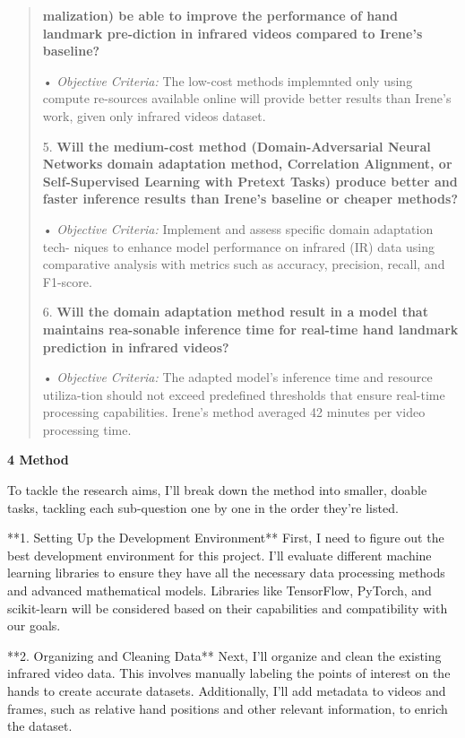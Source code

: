 \documentclass[
]{article}
\begin{document}
\begin{quote}
\textbf{malization) be able to improve the performance of hand landmark
pre-diction in infrared videos compared to Irene's baseline?}

• \emph{Objective Criteria:} The low-cost methods implemnted only using
compute re-sources available online will provide better results than
Irene's work, given only infrared videos dataset.

5. \textbf{Will the medium-cost method (Domain-Adversarial Neural
Networks domain adaptation method, Correlation Alignment, or
Self-Supervised Learning with Pretext Tasks) produce better and faster
inference results than Irene's baseline or cheaper methods?}

• \emph{Objective Criteria:} Implement and assess specific domain
adaptation tech- niques to enhance model performance on infrared (IR)
data using comparative analysis with metrics such as accuracy,
precision, recall, and F1-score.

6. \textbf{Will the domain adaptation method result in a model that
maintains rea-sonable inference time for real-time hand landmark
prediction in infrared videos?}

• \emph{Objective Criteria:} The adapted model's inference time and
resource utiliza-tion should not exceed predefined thresholds that
ensure real-time processing capabilities. Irene's method averaged 42
minutes per video processing time.
\end{quote}

\textbf{4 Method}

To tackle the research aims, I'll break down the method into smaller,
doable tasks, tackling each sub-question one by one in the order they're
listed.

**1. Setting Up the Development Environment** First, I need to figure
out the best development environment for this project. I'll evaluate
different machine learning libraries to ensure they have all the
necessary data processing methods and advanced mathematical models.
Libraries like TensorFlow, PyTorch, and scikit-learn will be considered
based on their capabilities and compatibility with our goals.

**2. Organizing and Cleaning Data** Next, I'll organize and clean the
existing infrared video data. This involves manually labeling the points
of interest on the hands to create accurate datasets. Additionally, I'll
add metadata to videos and frames, such as relative hand positions and
other relevant information, to enrich the dataset.
\end{document}
